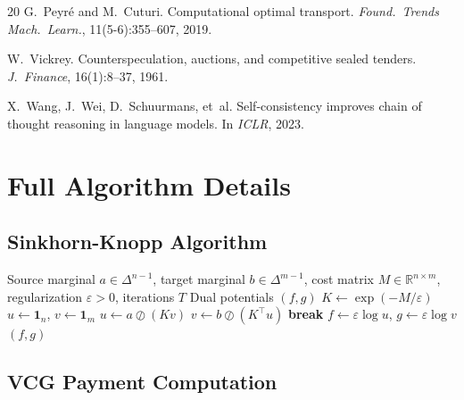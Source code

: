 \documentclass[10pt]{article}
\begin{document}
\begin{thebibliography}{20}
G.~Peyr\'{e} and M.~Cuturi.
\newblock Computational optimal transport.
\newblock \emph{Found.\ Trends Mach.\ Learn.}, 11(5-6):355--607, 2019.

W.~Vickrey.
\newblock Counterspeculation, auctions, and competitive sealed tenders.
\newblock \emph{J.\ Finance}, 16(1):8--37, 1961.

X.~Wang, J.~Wei, D.~Schuurmans, et~al.
\newblock Self-consistency improves chain of thought reasoning in language models.
\newblock In \emph{ICLR}, 2023.

\end{thebibliography}

\appendix
\newpage

\section{Full Algorithm Details}
\label{app:algorithms}

\subsection{Sinkhorn-Knopp Algorithm}

\begin{algorithm}[H]
\caption{Sinkhorn-Knopp for Entropic OT}
\label{alg:sinkhorn}
\begin{algorithmic}[1]
\REQUIRE Source marginal $a \in \Delta^{n-1}$, target marginal $b \in \Delta^{m-1}$, cost matrix $M \in \mathbb{R}^{n \times m}$, regularization $\varepsilon > 0$, iterations $T$
\ENSURE Dual potentials $(f, g)$
\STATE $K \leftarrow \exp(-M/\varepsilon)$
\STATE $u \leftarrow \mathbf{1}_n$, $v \leftarrow \mathbf{1}_m$
  \STATE $u \leftarrow a \oslash (K v)$
  \STATE $v \leftarrow b \oslash (K^\top u)$
    \STATE \textbf{break}
  \ENDIF
\ENDFOR
\STATE $f \leftarrow \varepsilon \log u$, $g \leftarrow \varepsilon \log v$
\RETURN $(f, g)$
\end{algorithmic}
\end{algorithm}

\subsection{VCG Payment Computation}
\end{document}
